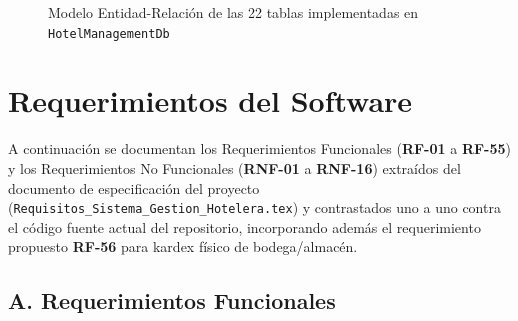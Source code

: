 \documentclass[12pt,a4paper]{article}
\begin{document}
\begin{figure}[H]
    \centering
    
    \caption{Modelo Entidad-Relaci\'on de las 22 tablas implementadas en \texttt{HotelManagementDb}}
    \label{fig:modelo_er}
\end{figure}

\section{Requerimientos del Software}

A continuaci\'on se documentan los Requerimientos Funcionales (\textbf{RF-01} a \textbf{RF-55}) y los Requerimientos No Funcionales (\textbf{RNF-01} a \textbf{RNF-16}) extra\'idos del documento de especificaci\'on del proyecto (\texttt{Requisitos\_Sistema\_Gestion\_Hotelera.tex}) y contrastados uno a uno contra el c\'odigo fuente actual del repositorio, incorporando adem\'as el requerimiento propuesto \textbf{RF-56} para kardex f\'isico de bodega/almac\'en.

\subsection{A. Requerimientos Funcionales}
\end{document}
